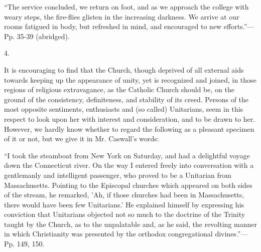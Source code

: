 ``The
service concluded, we return on foot, and as we approach the college
with weary steps, the fire-flies glisten in the increasing darkness.
We arrive at our rooms fatigued in body, but refreshed in mind, and
encouraged to new efforts.''—Pp. 35-39 (abridged).

4.

It is encouraging to find that the Church, though
deprived of all external aids towards keeping up the appearance of
unity, yet is recognized and joined, in those regions of religious
extravagance, as the Catholic Church should be, on the ground of the
consistency, definiteness, and stability of its creed. Persons of the
most opposite sentiments, enthusiasts and (so called) Unitarians, seem
in this respect to look upon her with interest and consideration, and
to be drawn to her. However, we hardly know whether to regard the
following as a pleasant specimen of it or not, but we give it in
Mr. Caswall's words:

``I
took the steamboat from New York on Saturday, and had a delightful
voyage down the Connecticut river. On the way I entered freely into
conversation with a gentlemanly and intelligent passenger, who proved
to be a Unitarian from Massachusetts. Pointing to the Episcopal
churches which appeared on both sides of the stream, he remarked, 'Ah,
if those churches had been in Massachusetts, there would have been few
Unitarians.' He explained himself by expressing his conviction that
Unitarians objected not so much to the doctrine of the Trinity taught
by the Church, as to the unpalatable and, as he said, the revolting
manner in which Christianity was presented by the orthodox
congregational divines.''—Pp. 149, 150.

